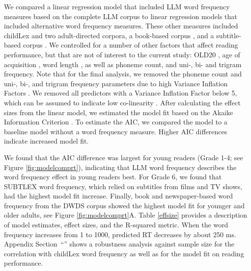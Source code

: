 \documentclass[manuscript]{stjour}
\begin{document}
We compared a linear regression model that included LLM word frequency measures based on the complete LLM corpus to linear regression models that included alternative word frequency measures. These other measures included childLex and two adult-directed corpora, a book-based corpus \citep[DWDS][]{heister_dlexdb_2011}, and a subtitle-based corpus \citep[SUBTLEX][]{brysbaert_word_2011}. We controlled for a number of other factors that affect reading performance, but that are not of interest to the current study: OLD20 \citep[e.g., ][]{yarkoni_moving_2008,hawelka_beyond_2013}, age of acquisition \citep[e.g., ][]{weekes_effects_2006}, word length \citep[e.g., ][]{gagl_sources_2015, huestegge_oculomotor_2009, marinus_variability_2010, zoccolotti_word_2005}, as well as phoneme count, and uni-, bi- and trigram frequency. Note that for the final analysis, we removed the phoneme count and uni-, bi-, and trigram frequency parameters due to high Variance Inflation Factors \citep{fox_generalized_1992}. We removed all predictors with a Variance Inflation Factor below 5, which can be assumed to indicate low co-linearity \citep[see][for a similar procedure]{gregorova_access_2023}. After calculating the effect sizes from the linear model, we estimated the model fit based on the Akaike Information Criterion \citep[AIC, ][]{akaike_new_1974}. To estimate the AIC, we compared the model to a baseline model without a word frequency measure. Higher AIC differences indicate increased model fit.

We found that the AIC difference was largest for young readers (Grade 1-4; see Figure \ref{fig:modelcomprt}), indicating that LLM word frequency describes the word frequency effect in young readers best. For Grade 6, we found that SUBTLEX word frequency, which relied on subtitles from films and TV shows, had the highest model fit increase. Finally, book and newspaper-based word frequency from the DWDS corpus showed the highest model fit for younger and older adults, see Figure \ref{fig:modelcomprt}A. Table \ref{effsize} provides a description of model estimates, effect sizes, and the R-squared metric. When the word frequency increases from 1 to 1000, predicted RT decreases by about 250 ms. Appendix Section~“” shows a robustness analysis against sample size for the correlation with childLex word frequency as well as for the model fit on reading performance. 
\end{document}
